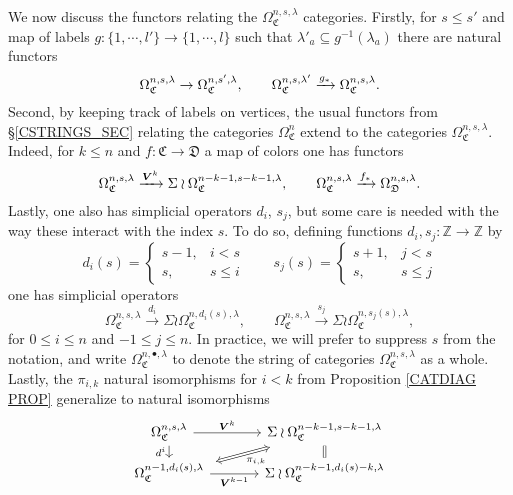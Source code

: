 \documentclass[a4paper,10pt
,draft
]{article}%
\renewcommand{\1}{\eta}%
\begin{document}
We now discuss the functors relating the $\Omega_{\mathfrak{C}}^{n,s,\lambda}$ categories. Firstly, for 
$s \leq s'$ 
and map of labels $g \colon \{1,\cdots,l'\} \to \{1,\cdots,l\}$
such that $\lambda'_a \subseteq g^{-1}\left( \lambda_a\right)$
there are natural functors
\[
\Omega_{\mathfrak{C}}^{n,s,\lambda} \to \Omega_{\mathfrak{C}}^{n,s',\lambda},
\qquad
\Omega_{\mathfrak{C}}^{n,s,\lambda'} \xrightarrow{g_{\**}} \Omega_{\mathfrak{C}}^{n,s,\lambda}.
\]
Second, by keeping track of labels on vertices,
the usual functors from \S \ref{CSTRINGS_SEC} relating the categories 
$\Omega^n_{\mathfrak{C}}$ extend to the categories
$\Omega_{\mathfrak{C}}^{n,s,\lambda}$. Indeed, for 
$k \leq n$
and 
$f \colon \mathfrak{C} \to \mathfrak{D}$ a map of colors
one has functors
\begin{equation}\label{FGTLABEL EQ}
\Omega_{\mathfrak{C}}^{n,s,\lambda} \xrightarrow{\boldsymbol{V}^k} \Sigma \wr\Omega_{\mathfrak{C}}^{n-k-1,s-k-1,\lambda},
\qquad
\Omega_{\mathfrak{C}}^{n,s,\lambda} \xrightarrow{f_{\**}} \Omega_{\mathfrak{D}}^{n,s,\lambda}.
\end{equation}
Lastly, one also has simplicial operators $d_i$, $s_j$, 
but some care is needed with the way these interact with the index $s$. To do so, defining functions $d_i,s_j\colon \mathbb{Z} \to \mathbb{Z}$ by
\begin{equation}\label{SIMPLEXP EQ}
 d_i(s) = 
\begin{cases}
s-1, & i<s
\\
s, & s\leq i
\end{cases}
\qquad
s_j(s) = 
\begin{cases}
s+1, & j<s
\\
s, & s\leq j
\end{cases}
\end{equation}
one has simplicial operators
\[
\Omega_{\mathfrak{C}}^{n,s,\lambda} \xrightarrow{d_i} \Sigma \wr\Omega_{\mathfrak{C}}^{n,d_i(s),\lambda},
\qquad
\Omega_{\mathfrak{C}}^{n,s,\lambda} \xrightarrow{s_j} \Sigma \wr\Omega_{\mathfrak{C}}^{n,s_j(s),\lambda},
\]
for $0\leq i \leq n$ and $-1\leq j \leq n$.
In practice, we will prefer to suppress $s$ from the notation,
and write 
$\Omega_{\mathfrak{C}}^{n,\bullet,\lambda}$ to denote the string of categories 
$\Omega_{\mathfrak{C}}^{n,s,\lambda}$ as a whole.
Lastly, the $\pi_{i,k}$ natural isomorphisms for $i<k$ from Proposition \ref{CATDIAG PROP}
generalize to natural isomorphisms
\begin{equation}
\begin{tikzcd}[row sep = tiny, column sep = 35pt]
	\Omega_{\mathfrak{C}}^{n,s,\lambda}
	\arrow{r}{\boldsymbol{V}^k} \arrow{dd}[swap]{d^i} &
	|[alias=U]|
	 \Sigma \wr \Omega_{\mathfrak{C}}^{n-k-1,s-k-1,\lambda}
	 \ar[equal]{dd}{}
\\
\\
	|[alias=V]|
	\Omega_{\mathfrak{C}}^{n-1,d_i(s),\lambda} \arrow{r}[swap]{\boldsymbol{V}^{k-1}} &
	 \Sigma \wr \Omega_{\mathfrak{C}}^{n-k-1,d_i(s)-k,\lambda}
\arrow[Leftrightarrow, from=V, to=U,shorten >=0.15cm,shorten <=0.15cm
,swap,"\pi_{i,k}"
]
\end{tikzcd}
\end{equation}
\end{document}

